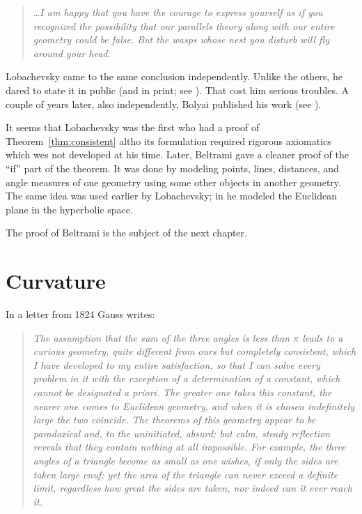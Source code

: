 \smallskip

\begin{quotation}{\it
\dots I am happy that you have the courage to express yourself as if you recognized the possibility
that our parallels theory along with our entire geometry could be false. But the wasps whose
nest you disturb will fly around your head.}
\end{quotation}

\smallskip

Lobachevsky came to the same conclusion independently.
Unlike the others, he dared to state it in public (and in print; see \cite{lobachevsky}).
That cost him serious troubles.
A couple of years later, also independently, Bolyai published his work (see \cite{bolyai}).

It seems that Lobachevsky was the first who had a proof of Theorem~\ref{thm:consistent} altho its formulation required rigorous axiomatics which wes not developed at his time.
Later, Beltrami gave a cleaner proof of the ``if'' part of the theorem.
It was done by modeling points, lines, distances, and angle measures of one geometry using some other objects in another geometry.
The same idea was used earlier by Lobachevsky; 
in \cite[\S34]{lobachevsky-1840} he modeled the Euclidean plane in the hyperbolic space.

The proof of Beltrami is the subject of the next chapter. 



\section*{Curvature}
In a letter from 1824 Gauss writes: 

\begin{quotation}{\it
The assumption that the sum of the three angles is less than $\pi$ leads to a curious geometry, 
quite different from ours but completely consistent, 
which I have developed to my entire satisfaction, 
so that I can solve every problem in it with the exception of a determination of a constant, which cannot be designated a priori. 
The greater one takes this constant, the nearer one comes to Euclidean geometry, 
and when it is chosen indefinitely large the two coincide.
The theorems of this geometry appear to be paradoxical and, 
to the uninitiated, absurd; but calm, steady reflection reveals that they contain nothing at all impossible. 
For example, the three angles of a triangle become as small as one wishes, if only the sides are taken large enuf; 
yet the area of the triangle can never exceed a definite limit, regardless how great the sides are taken, 
nor indeed can it ever reach it.}
\end{quotation} 

